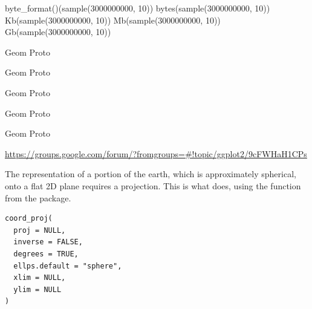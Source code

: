 \documentclass[a4paper]{book}
\begin{document}
%
\begin{Examples}
\begin{ExampleCode}
byte_format()(sample(3000000000, 10))
bytes(sample(3000000000, 10))
Kb(sample(3000000000, 10))
Mb(sample(3000000000, 10))
Gb(sample(3000000000, 10))
\end{ExampleCode}
\end{Examples}
%
\begin{Description}
Geom Proto

Geom Proto

Geom Proto

Geom Proto

Geom Proto
\end{Description}
%
\begin{References}
\url{https://groups.google.com/forum/?fromgroups=\#!topic/ggplot2/9cFWHaH1CPs}
\end{References}
%
\begin{Description}
The representation of a portion of the earth, which is approximately
spherical, onto a flat 2D plane requires a projection. This is what
 does, using the  function from
the  package.
\end{Description}
%
\begin{Usage}
\begin{verbatim}
coord_proj(
  proj = NULL,
  inverse = FALSE,
  degrees = TRUE,
  ellps.default = "sphere",
  xlim = NULL,
  ylim = NULL
)
\end{verbatim}
\end{Usage}
%
\end{document}
